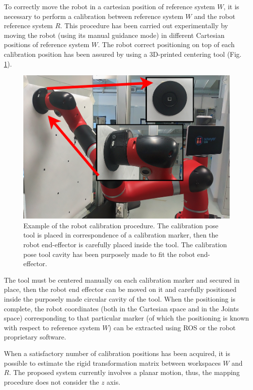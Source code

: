 \documentclass[a4paper, 10 pt, conference]{ieeeconf}      %
\begin{document}
To correctly move the robot in a cartesian position of reference system $W$, it is necessary to perform a calibration between reference system $W$ and the robot reference system $R$. This procedure has been carried out experimentally by moving the robot (using its manual guidance mode) in different Cartesian positions of reference system $W$. The robot correct positioning on top of each calibration position has been assured by using a 3D-printed centering tool (Fig. \ref{fig:robotcalib}). 

\begin{figure}[ht]
	\centering
	\includegraphics[width=1\columnwidth]{figures/robotcalibration}
	\caption{Example of the robot calibration procedure. The calibration pose tool is placed in correspondence of a calibration marker, then the robot end-effector is carefully placed inside the tool. The calibration pose tool cavity has been purposely made to fit the robot end-effector.}
	\label{fig:robotcalib}
\end{figure}

The tool must be centered manually on each calibration marker and secured in place, then the robot end effector can be moved on it and carefully positioned inside the purposely made circular cavity of the tool. When the positioning is complete, the robot coordinates (both in the Cartesian space and in the Joints space) corresponding to that particular marker (of which the positioning is known with respect to reference system $W$) can be extracted using ROS or the robot proprietary software. 

When a satisfactory number of calibration positions has been acquired, it is possible to estimate the rigid transformation matrix between workspaces $W$ and $R$. The proposed system currently involves a planar motion, thus, the mapping procedure does not consider the $z$ axis.
\end{document}
